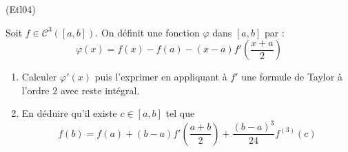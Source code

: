 \begin{tiny}(Etl04)\end{tiny} Soit $f\in \mathcal C^3([a,b])$. On définit une fonction $\varphi$ dans $[a,b]$ par :
\begin{displaymath}
\varphi(x) = f(x) -f(a)-(x-a)f'(\frac{x+a}{2}) 
\end{displaymath}
\begin{enumerate}
 \item Calculer $\varphi'(x)$ puis l'exprimer en appliquant à $f'$ une formule de Taylor à l'ordre $2$ avec reste intégral.
\item En déduire qu'il existe $c\in [a,b]$ tel que
\begin{displaymath}
 f(b) = f(a)+(b-a)f'(\frac{a+b}{2})+\frac{(b-a)^3}{24}f^{(3)}(c)
\end{displaymath}
 
\end{enumerate}
